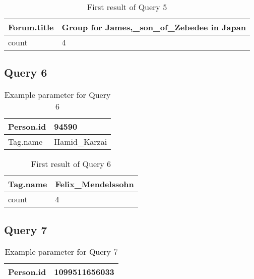\begin{table}[H]
    \begin{tabular}{|p{8cm}|p{8cm}|}
        \hline
        Forum.title & Group for James,\_son\_of\_Zebedee in Japan\\
        \hline
        count & 4 \\
        \hline
    \end{tabular}
    \caption{First result of Query 5}
\end{table}


\subsection{Query 6}

\begin{table}[H]
    \begin{tabular}{|l|l|}
        \hline
        Person.id & 94590  \\
        \hline
        Tag.name & Hamid\_Karzai  \\
        \hline
    \end{tabular}
    \caption{Example parameter for Query 6}
\end{table}

\begin{table}[H]
    \begin{tabular}{|p{8cm}|p{8cm}|}
        \hline
        Tag.name & Felix\_Mendelssohn \\
        \hline
        count & 4 \\
        \hline
    \end{tabular}
    \caption{First result of Query 6}
\end{table}

\subsection{Query 7}

\begin{table}[H]
    \begin{tabular}{|l|l|}
        \hline
        Person.id & 1099511656033 \\
        \hline
    \end{tabular}
    \caption{Example parameter for Query 7}
\end{table}

